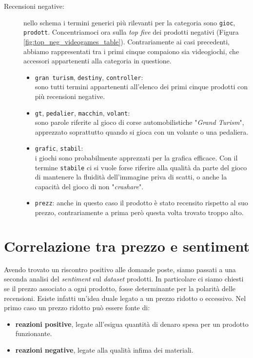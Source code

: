 \begin{description}
					\item[Recensioni negative:] 
					nello schema i termini generici più rilevanti per la categoria sono \verb|gioc|, \verb|prodott|. Concentriamoci ora sulla \textit{top five} dei prodotti negativi (Figura \ref{fig:top_neg_videogames_table}). Contrariamente ai casi precedenti, abbiamo rappresentati tra i primi cinque compaiono sia videogiochi, che accessori appartenenti alla categoria in questione.
					\begin{itemize}
						\item \texttt{gran turism}, \texttt{destiny}, \texttt{controller}: \\
						sono tutti termini appartenenti all'elenco dei primi cinque prodotti con più recensioni negative. 
						\item \texttt{gt}, \texttt{pedalier}, \texttt{macchin}, \texttt{volant}: \\
						sono parole riferite al gioco di corse automobilistiche "\textit{Grand Turism}", apprezzato soprattutto quando si gioca con un volante o una pedaliera. 
						\item \texttt{grafic}, \texttt{stabil}:\\ 
						i giochi sono probabilmente apprezzati per la grafica efficace. Con il termine \verb|stabile| ci si vuole forse riferire alla qualità da parte del gioco di  mantenere la fluidità dell'immagine priva di scatti, o anche la capacità del gioco di non "\textit{crashare}".
						\item \texttt{prezz}: 
						anche in questo caso il prodotto è stato recensito rispetto al suo prezzo, contrariamente a prima però questa volta trovato troppo alto.
					\end{itemize}
				\end{description}
				
		\section{Correlazione tra prezzo e sentiment}
			Avendo trovato un riscontro positivo alle domande poste, siamo passati a una seconda analisi del \textit{sentiment} sul \textit{dataset} prodotti. In particolare ci siamo chiesti se il prezzo associato a ogni prodotto, fosse determinante per la polarità delle recensioni. Esiste infatti un'idea duale legato a un prezzo ridotto o eccessivo. Nel primo caso un prezzo ridotto può essere fonte di:
			
			\begin{itemize}
				\item \textbf{reazioni positive}, legate all'esigua quantità di denaro spesa per un prodotto funzionante.
				\item \textbf{reazioni negative}, legate alla qualità infima dei materiali.
			\end{itemize}
		
